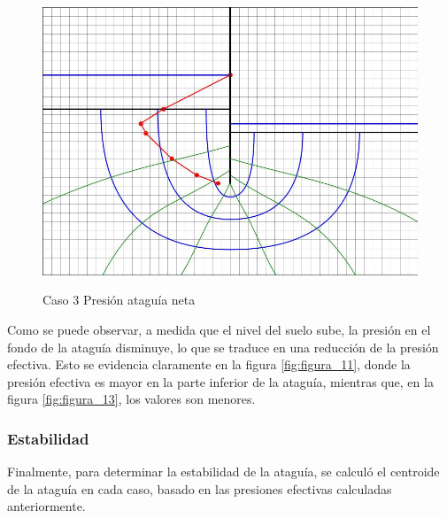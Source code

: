\begin{figure}[H]
    \begin{minipage}{0.32\textwidth}
        \centering
        \includegraphics[width=\textwidth]{GRAFICOS/caso_3_presion_ataguia_neta.jpg}
        \caption{Caso 3 Presión ataguía neta}
        \label{fig:caso_3_presion_ataguia_neta}
    \end{minipage}
\end{figure}

Como se puede observar, a medida que el nivel del suelo sube, la presión en el fondo de la ataguía disminuye, lo que se traduce en una reducción de la presión efectiva. Esto se evidencia claramente en la figura \ref{fig:figura_11}, donde la presión efectiva es mayor en la parte inferior de la ataguía, mientras que, en la figura \ref{fig:figura_13}, los valores son menores.


\subsubsection{Estabilidad}
Finalmente, para determinar la estabilidad de la ataguía, se calculó el centroide de la ataguía en cada caso, basado en las presiones efectivas calculadas anteriormente.

